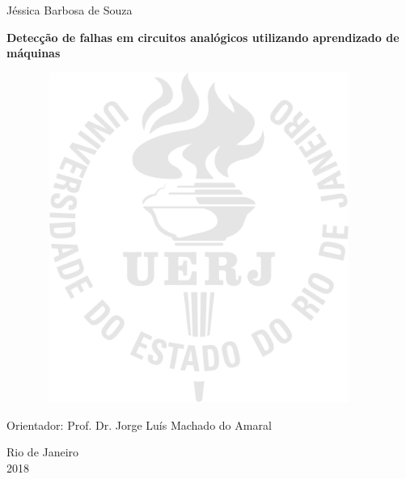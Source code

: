 \begin{center}

Jéssica Barbosa de Souza

\vspace{2cm}

\textbf{Detecção de falhas em circuitos analógicos utilizando aprendizado de máquinas}

\vspace{1.0cm}

\begin{figure}[hbt!]
\begin{center}
\includegraphics[width=10.48cm,height=10.8cm]{./01_Pre_textuais/logo_uerj_gnd_pb.png}
\end{center}
\end{figure}

\vspace{-9cm}
\begin{flushright}
\parbox{8cm}{
}
\end{flushright}

\vspace{4.0cm}

Orientador: Prof. Dr. Jorge Luís Machado do Amaral\\

\par\vfill

Rio de Janeiro\\2018

\end{center}